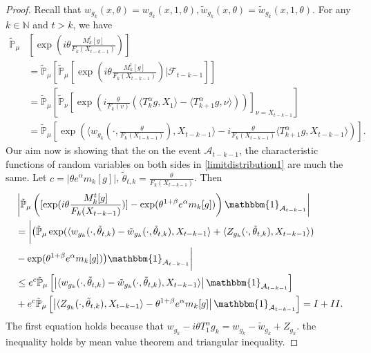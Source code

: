 \documentclass{article}
\begin{document}
\begin{proof}
    Recall that $w_{g_k}(x,\theta)=w_{g_k}(x,1,\theta),\tilde{w}_{g_k}(x,\theta)=\tilde{w}_{g_k}(x,1,\theta)$. For any $k\in\mathbb{N}$ and $t>k$, we have
    \begin{align*}
        \mathbb{\tilde{P}}_{\mu}&[\exp(i\theta\frac {M_k^t[g]}{F_k(X_{t-k-1})})]\\
        &=\mathbb{\tilde{P}}_{\mu}\left[\mathbb{\tilde{P}}_{\mu}[\exp(i\theta\frac{M_k^t[g]}{F_k(X_{t-k-1})})|\mathcal{F}_{t-k-1}]\right]\\
        &=\mathbb{\tilde{P}}_{\mu}\left[\mathbb{\tilde{P}}_{\nu}\left[\exp\left(i\frac{\theta}{F_k(v)}(\langle T_k^{\alpha}g,X_1\rangle-\langle T_{k+1}^{\alpha}g,\nu\rangle)\right)\right]_{\nu=X_{t-k-1}}\right]\\
        &=\mathbb{\tilde{P}}_{\mu}\left[\exp\left(\langle w_{g_k}(\cdot,\frac{\theta}{F_k(X_{t-k-1})}),X_{t-k-1}\rangle-i\frac{\theta}{F_k(X_{t-k-1})}\langle T_{k+1}^{\alpha}g, X_{t-k-1}\rangle\right)\right].
    \end{align*}
    Our aim now is showing that the on the event $\mathcal{A}_{t-k-1}$, the characteristic functions of random variables on both sides in \eqref{limitdistribution1} are much the same. Let $c=|\theta e^{\alpha}m_k[g]|$, $\tilde{\theta}_{t,k}=\frac{\theta}{F_k(X_{t-k-1})}$. Then
    \begin{align*}
        &\left|\mathbb{\tilde{P}}_{\mu}\left([\exp(i\theta \frac {M_k^t[g]}{F_k(X_{t-k-1})})]-\exp(\theta^{1+\beta}e^{\alpha}m_k[g])\right)\mathbbm{1}_{\mathcal{A}_{t-k-1}}\right|\\
        &=\bigg|\big(\mathbb{\tilde{P}}_{\mu}\exp(\langle w_{g_k}(\cdot,\tilde{\theta}_{t,k})-\tilde{w}_{g_k}(\cdot, \tilde{\theta}_{t,k}),X_{t-k-1}\rangle+\langle Z_{g_k}(\cdot,\tilde{\theta}_{t,k}),X_{t-k-1}\rangle)\\
        &-\exp(\theta^{1+\beta}e^{\alpha}m_k[g])\big)\mathbbm{1}_{\mathcal{A}_{t-k-1}}\bigg|\\
        &\leq e^c\mathbb{\tilde{P}}_{\mu}\left[\left|\langle w_{g_k}(\cdot,\tilde{\theta}_{t,k})-\tilde{w}_{g_k}(\cdot,\tilde{\theta}_{t,k}), X_{t-k-1}\rangle\right|\mathbbm{1}_{\mathcal{A}_{t-k-1}}\right]\\
        &+e^c\mathbb{\tilde{P}}_{\mu}\left[\left|\langle Z_{g_k}(\cdot,\tilde{\theta}_{t,k}),X_{t-k-1}\rangle-\theta^{1+\beta}e^{\alpha}m_k[g]\right|\mathbbm{1}_{\mathcal{A}_{t-k-1}}\right]=I+II.
    \end{align*}
    The first equation holds because that $w_{g_k}-i\theta T_1^{\alpha}g_k=w_{g_k}-\tilde{w}_{g_k}+Z_{g_k}$. the inequality holds by mean value theorem and triangular inequality.
    

\end{proof}
\end{document}
